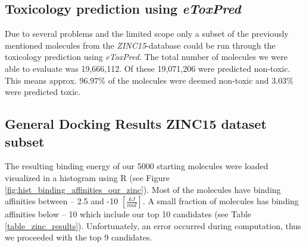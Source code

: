 \documentclass[11pt, letterpaper, titlepage]{article}
\begin{document}
\subsection{Toxicology prediction using \emph{eToxPred}}

Due to several problems and the limited scope only a subset of the previously mentioned molecules from the \emph{ZINC15}-database could be run through the toxicology prediction using \emph{eToxPred}. The total number of molecules we were able to evaluate was 19,666,112. Of these 19,071,206 were predicted non-toxic. This means approx. 96.97\% of the molecules were deemed non-toxic and 3.03\% were predicted toxic.

\subsection{General Docking Results ZINC15 dataset subset} 

The resulting binding energy of our 5000 starting molecules were loaded visualized in a histogram using R (see Figure \ref{fig:hist_binding_affinities_our_zinc}). Most of the molecules have binding affinities between – 2.5 and -10  $[\frac{kJ}{mol}]$. A small fraction of molecules has binding affinities below – 10 which include our top 10 candidates (see Table \ref{table_zinc_results}). Unfortunately, an error occurred during computation, thus we proceeded with the top 9 candidates. 
\end{document}

